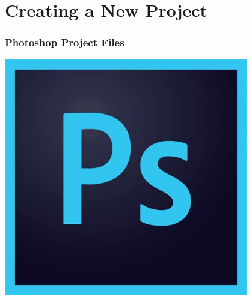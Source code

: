 \documentclass{beamer}
\begin{document}
	\section{Creating a New Project}
		\begin{frame}
		\frametitle{Photoshop Project Files}
		\begin{center}
			\includegraphics[width = 0.8\textwidth]{images/th.jpg}
		\end{center}
	\end{frame}
	
\end{document}
